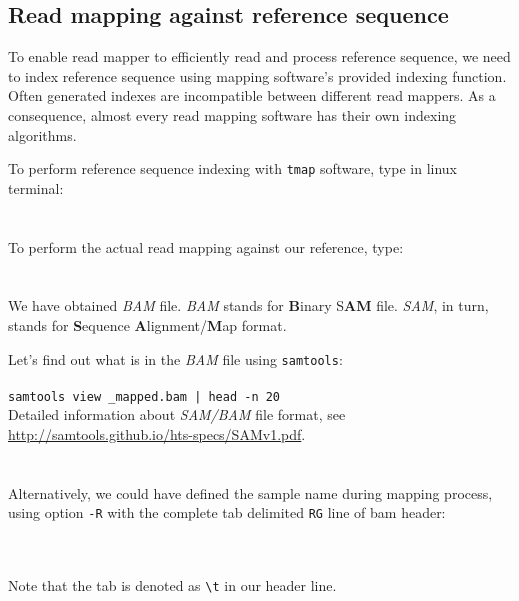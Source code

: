 \subsection{Read mapping against reference sequence}

To enable read mapper to efficiently read and process reference sequence, we need to
index reference sequence using mapping software's provided indexing function. Often generated
indexes are incompatible between different read mappers. As a consequence, almost every read
mapping software has their own indexing algorithms.

To perform reference sequence indexing with \texttt{tmap} software, type in linux terminal:\\~\\
\texttt{}\\

To perform the actual read mapping against our reference, type:\\~\\
\\

We have obtained \textit{BAM} file. \textit{BAM} stands for \textbf{B}inary S\textbf{AM} file.
\textit{SAM}, in turn, stands for \textbf{S}equence \textbf{A}lignment/\textbf{M}ap format.


Let's find out what is in the \textit{BAM} file using \texttt{samtools}:\\~\\
\texttt{samtools view \mapReads\_mapped.bam | head -n 20}\\

Detailed information about \textit{SAM/BAM} file format, see \url{http://samtools.github.io/hts-specs/SAMv1.pdf}.\\~\\
\\

Alternatively, we could have defined the sample name during mapping process,
using option \texttt{-R} with the complete tab delimited \texttt{RG} line of bam header:\\~\\
\\

\begin{framed}
Note that the tab is denoted as \texttt{\textbackslash t} in our header line.
\end{framed}

